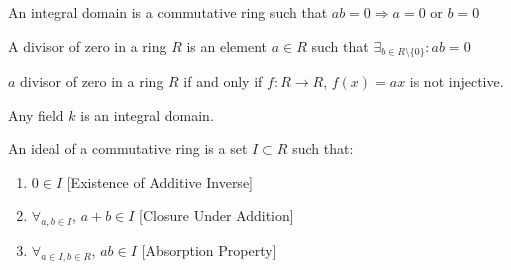 \documentclass[crop=false,class=article,oneside]{standalone}
\begin{document}
            \begin{definition}
            An integral domain is a commutative ring such that $ab=0\Rightarrow a=0$ or $b=0$
            \end{definition}
            \begin{definition}
            A divisor of zero in a ring $R$ is an element $a\in R$ such that $\exists_{b\in R\setminus\{0\}}:ab=0$
            \end{definition}
            \begin{theorem}
            $a$ divisor of zero in a ring $R$ if and only if $f:R\rightarrow R$, $f(x) = ax$ is not injective.
            \end{theorem}
            \begin{theorem}
            Any field $k$ is an integral domain.
            \end{theorem}
            \begin{definition}
            An ideal of a commutative ring is a set $I\subset R$ such that:
            \begin{enumerate}
                \item $0\in I$ \hfill [Existence of Additive Inverse]
                \item $\forall_{a,b\in I}$, $a+b\in I$ \hfill [Closure Under Addition]
                \item $\forall_{a\in I,b\in R}$, $a b \in I$ \hfill [Absorption Property]
            \end{enumerate}
            \end{definition}
\end{document}

